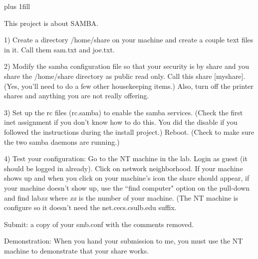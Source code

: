 
\rightskip=0pt plus 1fill

\parindent 0pt

This project is about SAMBA.

1) Create a directory {\ltt{}/home/share} on your machine and
create a couple text files in it. Call them {\ltt{}sam.txt} and 
{\ltt{}joe.txt}.

2) Modify the samba configuration file so that your security is by
share and you share the {\ltt{}/home/share} directory as public
read only. Call this share {\ltt{}[myshare]}. (Yes, you'll need
to do a few other housekeeping items.)
Also, turn off the printer shares and anything you are not really
offering.

3) Set up the rc files ({\ltt{}rc.samba}) to enable the samba services.
(Check the first inet assignment if you don't know how to do this.
You did the disable if you followed the instructions during the install
project.) Reboot. (Check to make sure the two samba daemons are running.)

4) Test your configuration: Go to the NT machine in the lab.
Login as guest (it should be logged in already). Click on network 
neighborhood. If your machine shows up and when you click on
your machine's icon the share should appear, if your
machine doesn't show up, use the ``find computer" option on the pull-down
and find {\ltt{}lab}{\it{}xx} where {\it xx} is the number of your machine.
(The NT machine is configure so it doesn't need the {\ltt{}net.cecs.csulb.edu}
suffix.

Submit: a copy of your smb.conf with the comments removed.

Demonstration: When you hand your submission to me, you must use the NT machine
to demonstrate that your share works.
\bye
